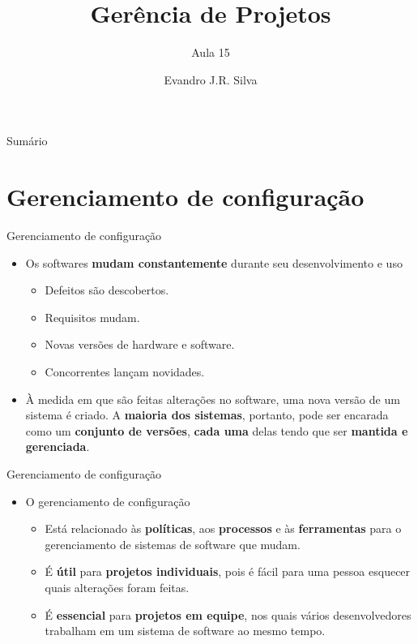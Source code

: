 \documentclass{beamer}
\title[GP 15]{Gerência de Projetos}
\subtitle{Aula 15}
\author[E.J.R. Silva]{Evandro J.R. Silva}
\date{}
\begin{document}
    
\begin{frame}
    \titlepage
\end{frame}

\begin{frame}{Sumário}
    \tableofcontents
\end{frame}

\section{Gerenciamento de configuração}


\begin{frame}{Gerenciamento de configuração}
	\begin{itemize}
		\justifying
		\item<1-5> Os softwares \textbf{mudam constantemente} durante seu desenvolvimento e uso
		\begin{itemize}
			\justifying
			\item<2-5> Defeitos são descobertos.
			\item<3-5> Requisitos mudam.
			\item<4-5> Novas versões de hardware e software.
			\item<5> Concorrentes lançam novidades.
		\end{itemize}
		\item<6> À medida em que são feitas alterações no software, uma nova versão de um sistema é criado. A \textbf{maioria dos sistemas}, portanto, pode ser encarada como um \textbf{conjunto de versões}, \textbf{cada uma} delas tendo que ser \textbf{mantida e gerenciada}.
	\end{itemize}
\end{frame}

\begin{frame}{Gerenciamento de configuração}
	\begin{itemize}
		\justifying
		\item O gerenciamento de configuração
		\begin{itemize}
			\justifying
			\item<1-> Está relacionado às \textbf{políticas}, aos \textbf{processos} e às \textbf{ferramentas} para o gerenciamento de sistemas de software que mudam.
			\item<2-> É \textbf{útil} para \textbf{projetos individuais}, pois é fácil para uma pessoa esquecer quais alterações foram feitas.
			\item<3> É \textbf{essencial} para \textbf{projetos em equipe}, nos quais vários desenvolvedores trabalham em um sistema de software ao mesmo tempo.
		\end{itemize}
	\end{itemize}
\end{frame}
\end{document}
